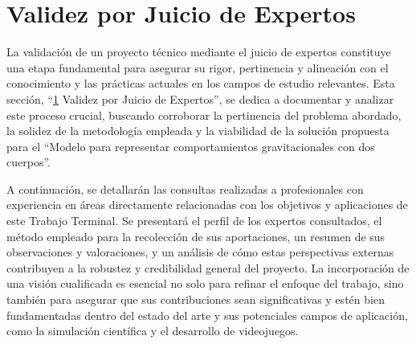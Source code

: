 \section{Validez por Juicio de Expertos}%
\label{sec:analisis_expertos}

La validación de un proyecto técnico mediante el juicio de expertos constituye una etapa fundamental para asegurar su rigor, pertinencia y alineación con el conocimiento y las prácticas actuales en los campos de estudio relevantes. Esta sección, ``\ref{sec:analisis_expertos} Validez por Juicio de Expertos'', se dedica a documentar y analizar este proceso crucial, buscando corroborar la pertinencia del problema abordado, la solidez de la metodología empleada y la viabilidad de la solución propuesta para el ``Modelo para representar comportamientos gravitacionales con dos cuerpos''.

A continuación, se detallarán las consultas realizadas a profesionales con experiencia en áreas directamente relacionadas con los objetivos y aplicaciones de este Trabajo Terminal. Se presentará el perfil de los expertos consultados, el método empleado para la recolección de sus aportaciones, un resumen de sus observaciones y valoraciones, y un análisis de cómo estas perspectivas externas contribuyen a la robustez y credibilidad general del proyecto. La incorporación de una visión cualificada es esencial no solo para refinar el enfoque del trabajo, sino también para asegurar que sus contribuciones sean significativas y estén bien fundamentadas dentro del estado del arte y sus potenciales campos de aplicación, como la simulación científica y el desarrollo de videojuegos.


